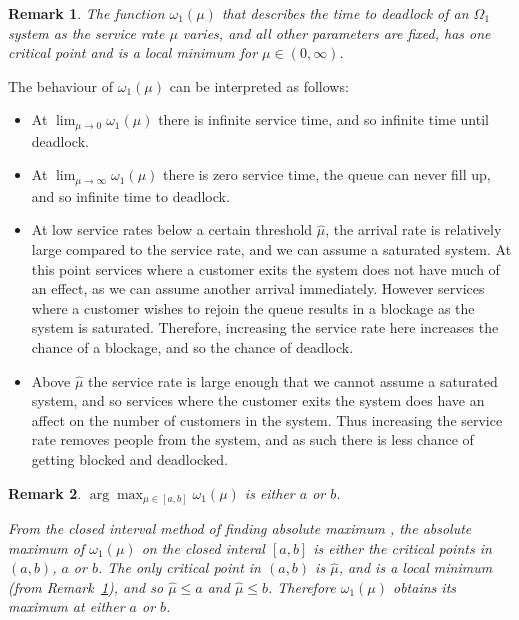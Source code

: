 \documentclass{article}
\newtheorem{remark}{Remark}
\begin{document}
\begin{remark}\label{rem:oneminima}
The function $\omega_1(\mu)$ that describes the time to deadlock of an $\Omega_1$ system as the service rate $\mu$ varies, and all other parameters are fixed, has one critical point and is a local minimum for $\mu \in (0, \infty)$.
\end{remark}

The behaviour of $\omega_1(\mu)$ can be interpreted as follows:
\begin{itemize}
\item At $\lim_{\mu \to 0} \omega_1 (\mu)$ there is infinite service time, and so infinite time until deadlock.
\item At $\lim_{\mu \to \infty} \omega_1 (\mu)$ there is zero service time, the queue can never fill up, and so infinite time to deadlock.
\item At low service rates below a certain threshold $\hat{\mu}$, the arrival rate is relatively large compared to the service rate, and we can assume a saturated system.
At this point services where a customer exits the system does not have much of an effect, as we can assume another arrival immediately.
However services where a customer wishes to rejoin the queue results in a blockage as the system is saturated.
Therefore, increasing the service rate here increases the chance of a blockage, and so the chance of deadlock.
\item Above $\hat{\mu}$ the service rate is large enough that we cannot assume a saturated system, and so services where the customer exits the system does have an affect on the number of customers in the system.
Thus increasing the service rate removes people from the system, and as such there is less chance of getting blocked and deadlocked.
\end{itemize}

\begin{remark}\label{rem:findmaximum}
$\arg\max_{\mu \in [a, b]} \omega_1(\mu)$ is either $a$ or $b$.

From the closed interval method of finding absolute maximum \cite{tan09}, the absolute maximum of $\omega_1(\mu)$ on the closed interal $[a, b]$ is either the critical points in $(a, b)$, $a$ or $b$.
The only critical point in $(a, b)$ is $\hat{\mu}$, and is a local minimum (from Remark~\ref{rem:oneminima}), and so $\hat{\mu} \leq a$ and $\hat{\mu} \leq b$.
Therefore $\omega_1(\mu)$ obtains its maximum at either $a$ or $b$.
\end{remark}
\end{document}
